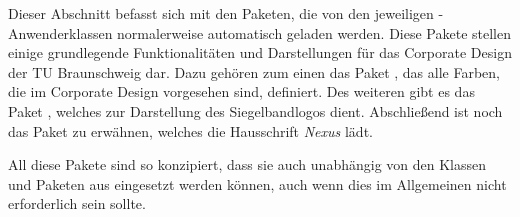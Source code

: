 \documentclass[a4paper,11pt,twoside=false,rgb,extramargin]{tubsbook}
\newcommand{\CD}{Corporate Design\xspace}
\begin{document}
Dieser Abschnitt befasst sich mit den Paketen, die von den jeweiligen
\tubslatex-Anwenderklassen normalerweise automatisch geladen werden.
Diese Pakete stellen einige grundlegende Funktionalitäten und Darstellungen
für das \CD der TU Braunschweig dar. Dazu gehören zum einen das Paket
, das alle Farben, die im \CD vorgesehen sind,
definiert. Des weiteren gibt es das Paket , welches
zur Darstellung des Siegelbandlogos dient. Abschließend ist noch das Paket
 zu erwähnen, welches die Hausschrift \emph{Nexus}
lädt.

All diese Pakete sind so konzipiert, dass sie auch unabhängig von den
Klassen und Paketen aus \tubslatex eingesetzt werden können, auch wenn dies
im Allgemeinen nicht erforderlich sein sollte.




\appendix



\printglossary[style=altlist,title=Glossar]



\listoffigures



\end{document}
